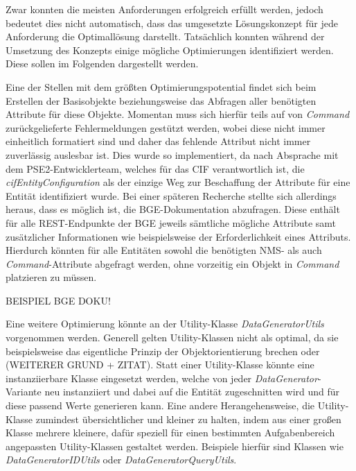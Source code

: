 Zwar konnten die meisten Anforderungen erfolgreich erfüllt werden, jedoch bedeutet dies nicht automatisch, dass das umgesetzte Lösungskonzept für jede Anforderung die Optimallösung darstellt. Tatsächlich konnten während der Umsetzung des Konzepts einige mögliche Optimierungen identifiziert werden. Diese sollen im Folgenden dargestellt werden.

Eine der Stellen mit dem größten Optimierungspotential findet sich beim Erstellen der Basisobjekte beziehungsweise das Abfragen aller benötigten Attribute für diese Objekte. Momentan muss sich hierfür teils auf von \textit{Command} zurückgelieferte Fehlermeldungen gestützt werden, wobei diese nicht immer einheitlich formatiert sind und daher das fehlende Attribut nicht immer zuverlässig auslesbar ist. Dies wurde so implementiert, da nach Absprache mit dem PSE2-Entwicklerteam, welches für das \ac{CIF} verantwortlich ist, die \textit{cifEntityConfiguration} als der einzige Weg zur Beschaffung der Attribute für eine Entität identifiziert wurde. Bei einer späteren Recherche stellte sich allerdings heraus, dass es möglich ist, die \ac{BGE}-Dokumentation abzufragen. Diese enthält für alle \ac{REST}-Endpunkte der \ac{BGE} jeweils sämtliche mögliche Attribute samt zusätzlicher Informationen wie beispielsweise der Erforderlichkeit eines Attributs. Hierdurch könnten für alle Entitäten sowohl die benötigten \ac{NMS}- als auch \textit{Command}-Attribute abgefragt werden, ohne vorzeitig ein Objekt in \textit{Command} platzieren zu müssen. 

BEISPIEL BGE DOKU!

Eine weitere Optimierung könnte an der Utility-Klasse \textit{DataGeneratorUtils} vorgenommen werden. Generell gelten Utility-Klassen nicht als optimal, da sie beispielsweise das eigentliche Prinzip der Objektorientierung brechen oder (WEITERER GRUND + ZITAT). Statt einer Utility-Klasse könnte eine instanziierbare Klasse eingesetzt werden, welche von jeder \textit{DataGenerator}-Variante neu instanziiert und dabei auf die Entität zugeschnitten wird und für diese passend Werte generieren kann. Eine andere Herangehensweise, die Utility-Klasse zumindest übersichtlicher und kleiner zu halten, indem aus einer großen Klasse mehrere kleinere, dafür speziell für einen bestimmten Aufgabenbereich angepassten Utility-Klassen gestaltet werden. Beispiele hierfür sind Klassen wie \textit{DataGeneratorIDUtils} oder \textit{DataGeneratorQueryUtils}.

